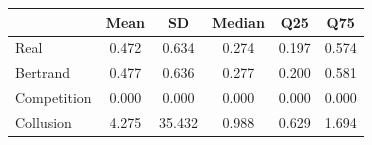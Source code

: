 \begin{tabular}{lccccc}
\toprule
 & Mean & SD & Median & Q25 & Q75 \\
\midrule
Real & 0.472 & 0.634 & 0.274 & 0.197 & 0.574 \\
Bertrand & 0.477 & 0.636 & 0.277 & 0.200 & 0.581 \\
Competition & 0.000 & 0.000 & 0.000 & 0.000 & 0.000 \\
Collusion & 4.275 & 35.432 & 0.988 & 0.629 & 1.694 \\
\bottomrule
\end{tabular}
